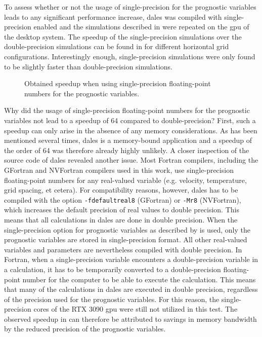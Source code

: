 To assess whether or not the usage of single-precision for the prognostic variables leads to any significant performance increase, \acrshort{dales} was compiled with single-precision enabled and the simulations described in  were repeated on the \acrshort{gpu} of the desktop system. The speedup of the single-precision simulations over the double-precision simulations can be found in  for different horizontal grid configurations. Interestingly enough, single-precision simulations were only found to be slightly faster than double-precision simulations.

\begin{figure}[h!]
    \centering
    
    \caption{Obtained speedup when using single-precision floating-point numbers for the prognostic variables.}
    \label{fig:single_vs_double_precision}
\end{figure}

Why did the usage of single-precision floating-point numbers for the prognostic variables not lead to a speedup of 64 compared to double-precision? First, such a speedup can only arise in the absence of any memory considerations. As has been mentioned several times, \acrshort{dales} is a memory-bound application and a speedup of the order of 64 was therefore already highly unlikely. A closer inspection of the source code of \acrshort{dales} revealed another issue. Most Fortran compilers, including the GFortran and NVFortran compilers used in this work, use single-precision floating-point numbers for any real-valued variable (e.g. velocity, temperature, grid spacing, et cetera). For compatibility reasons, however, \acrshort{dales} has to be compiled with the option \texttt{-fdefaultreal8} (GFortran) or \texttt{-Mr8} (NVFortran), which increases the default precision of real values to double precision. This means that all calculations in \acrshort{dales} are done in double precision. When the single-precision option for prognostic variables as described by \citet{janssonCloudBotanyShallow2023} is used, only the prognostic variables are stored in single-precision format. All other real-valued variables and parameters are nevertheless compiled with double precision. In Fortran, when a single-precision variable encounters a double-precision variable in a calculation, it has to be temporarily converted to a double-precision floating-point number for the computer to be able to execute the calculation. This means that many of the calculations in \acrshort{dales} are executed in double precision, regardless of the precision used for the prognostic variables. For this reason, the single-precision cores of the RTX 3090 \acrshort{gpu} were still not utilized in this test. The observed speedup in  can therefore be attributed to savings in memory bandwidth by the reduced precision of the prognostic variables.

